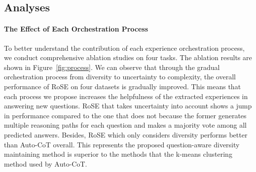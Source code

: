 \documentclass[11pt]{article}
\begin{document}
\begin{table}[ht]
\caption{The impact of uncertainty threshold.}
\label{tab:ablation_para}
\end{table}


\subsection{Analyses}

\paragraph{The Effect of Each Orchestration Process} To better understand the contribution of each experience orchestration process, we conduct comprehensive ablation studies on four tasks. The ablation results are shown in Figure~\ref{fig:process}. We can observe that through the gradual orchestration process from diversity to uncertainty to complexity, the overall performance of RoSE on four datasets is gradually improved. This means that each process we propose increases the helpfulness of the extracted experiences in answering new questions. RoSE that takes uncertainty into account shows a jump in performance compared to the one that does not because the former generates multiple reasoning paths for each question and makes a majority vote among all predicted answers. Besides, RoSE which only considers diversity performs better than Auto-CoT overall. This represents the proposed question-aware diversity maintaining method is superior to the methods that the k-means clustering method used by Auto-CoT.   
\end{document}
